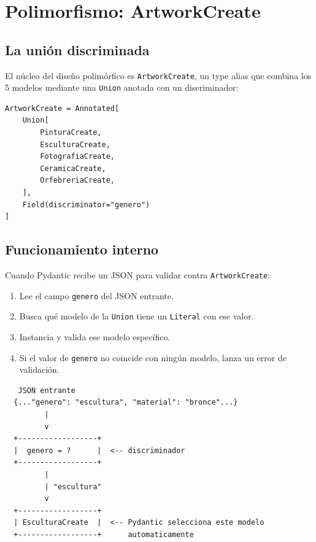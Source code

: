\documentclass[12pt,a4paper]{article}
\begin{document}
\section{Polimorfismo: ArtworkCreate}

\subsection{La unión discriminada}

El núcleo del diseño polimórfico es \texttt{ArtworkCreate}, un type alias
que combina los 5 modelos mediante una \texttt{Union} anotada con un
discriminador:

\begin{lstlisting}
ArtworkCreate = Annotated[
    Union[
        PinturaCreate,
        EsculturaCreate,
        FotografiaCreate,
        CeramicaCreate,
        OrfebreriaCreate,
    ],
    Field(discriminator="genero")
]
\end{lstlisting}

\subsection{Funcionamiento interno}

Cuando Pydantic recibe un JSON para validar contra \texttt{ArtworkCreate}:

\begin{enumerate}
    \item Lee el campo \texttt{genero} del JSON entrante.
    \item Busca qué modelo de la \texttt{Union} tiene un \texttt{Literal} con
          ese valor.
    \item Instancia y valida ese modelo específico.
    \item Si el valor de \texttt{genero} no coincide con ningún modelo,
          lanza un error de validación.
\end{enumerate}

\begin{center}
\begin{minipage}{0.9\textwidth}
\footnotesize
\begin{verbatim}
   JSON entrante
  {..."genero": "escultura", "material": "bronce"...}
         |
         v
  +------------------+
  |  genero = ?      |  <-- discriminador
  +------------------+
         |
         | "escultura"
         v
  +------------------+
  | EsculturaCreate  |  <-- Pydantic selecciona este modelo
  +------------------+      automaticamente
\end{verbatim}
\end{minipage}
\end{center}
\end{document}

